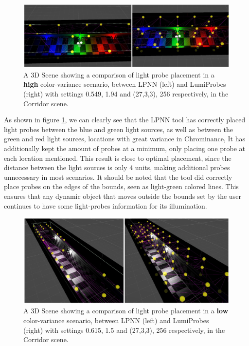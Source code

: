 \begin{figure}[h]
	\centering
	\includegraphics[scale=0.18]{Graphics/results/concats/comparison1.png}
	\caption{A 3D Scene showing a comparison of light probe placement in a \textbf{high} color-variance scenario, between LPNN (left) and LumiProbes (right) with settings 0.549, 1.94 and (27,3,3), 256 respectively, in the Corridor scene.}
	\label{fig:comp1}
\end{figure}

As shown in figure \ref{fig:comp1}, we can clearly see that the LPNN tool has correctly placed light probes between the blue and green light sources, as well as between the green and red light sources, locations with great variance in Chrominance, It has additionally kept the amount of probes at a minimum, only placing one probe at each location mentioned. This result is close to optimal placement, since the distance between the light sources is only 4 units, making additional probes unnecessary in most scenarios. It should be noted that the tool did correctly place probes on the edges of the bounds, seen as light-green colored lines. This ensures that any dynamic object that moves outside the bounds set by the user continues to have some light-probes information for its illumination. 

\begin{figure}[h]
	\centering
	\includegraphics[scale=0.25]{Graphics/results/concats/comparison2.png}
	\caption{A 3D Scene showing a comparison of light probe placement in a \textbf{low} color-variance scenario, between LPNN (left) and LumiProbes (right) with settings 0.615, 1.5 and (27,3,3), 256 respectively, in the Corridor scene.}
	\label{fig:comp2}
\end{figure}


